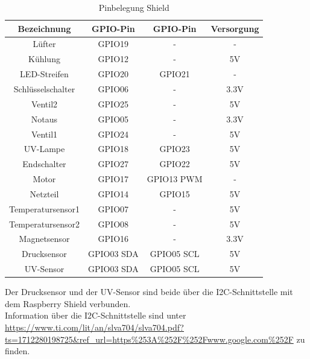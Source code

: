 \begin{table}[h]
    \centering
    \begin{tabular}{ | c | c | c | c | } 
  \hline
  \textbf{ Bezeichnung} & \textbf{ GPIO-Pin} & \textbf{ GPIO-Pin} & \textbf{ Versorgung}\\
  \hline
   Lüfter & GPIO19 & - & -  \\ 
  \hline
    Kühlung & GPIO12 & - & 5V  \\ 
  \hline
   LED-Streifen & GPIO20 & GPIO21 & - \\ 
  \hline
   Schlüsselschalter & GPIO06 & - & 3.3V \\ 
  \hline
   Ventil2 & GPIO25 & - & 5V \\
  \hline
   Notaus & GPIO05 & - & 3.3V \\
  \hline
   Ventil1 & GPIO24 & - & 5V \\
  \hline
   UV-Lampe & GPIO18 & GPIO23 & 5V \\
  \hline
   Endschalter & GPIO27 & GPIO22 & 5V \\
  \hline
   Motor & GPIO17 & GPIO13 PWM & - \\
  \hline
   Netzteil & GPIO14 & GPIO15 & 5V \\
  \hline
   Temperatursensor1 & GPIO07 & - & 5V \\
  \hline
   Temperatursensor2 & GPIO08 & - & 5V \\
  \hline
   Magnetsensor & GPIO16 & - & 3.3V \\
  \hline
   Drucksensor & GPIO03 SDA & GPIO05 SCL & 5V \\
  \hline
   UV-Sensor & GPIO03 SDA & GPIO05 SCL & 5V \\
  \hline
\end{tabular}
    \caption{Pinbelegung \raspi Shield}
\end{table}
\newpage
Der Drucksensor und der UV-Sensor sind beide über die I2C-Schnittstelle mit dem Raspberry Shield verbunden.\\
\vspace{3mm}
Information über die I2C-Schnittstelle sind unter \url{https://www.ti.com/lit/an/slva704/slva704.pdf?ts=1712280198725&ref_url=https%253A%252F%252Fwww.google.com%252F} zu finden.\\

\newpage
\begin{figure}[h]
\centering
    
\end{figure}
\pagebreak
